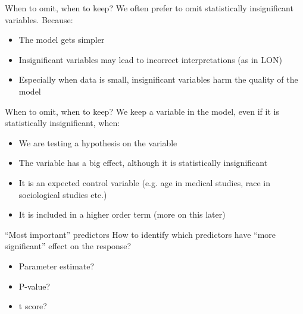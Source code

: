 \documentclass{beamer}\usepackage[]{graphicx}\usepackage[]{color}
\begin{document}
\begin{darkframes}
    
    \begin{frame}{When to omit, when to keep?}
      We often prefer to omit statistically insignificant variables. Because:
      \begin{itemize}
        \item The model gets simpler
        \item Insignificant variables may lead to incorrect interpretations (as in LON)
        \item Especially when data is small, insignificant variables harm the quality of the model
        
      \end{itemize}
      
    \end{frame}
    
    \begin{frame}{When to omit, when to keep?}
      We keep a variable in the model, even if it is statistically insignificant, when:
      \begin{itemize}
        \item We are testing a hypothesis on the variable
        \item The variable has a big effect, although it is statistically insignificant
        \item It is an expected control variable (e.g. age in medical studies, race in sociological studies etc.)
        \item It is included in a higher order term (more on this later)
        
      \end{itemize}
      
    \end{frame}
    
    
    \begin{frame}{``Most important'' predictors}
      How to identify which predictors have ``more significant'' effect on the response?
      
      \begin{itemize}
        \item[] Parameter estimate? \pause
        \item[] P-value? \pause
        \item[] t score? \pause \greencheckmark
        
      \end{itemize}
      
    \end{frame}
    

\end{darkframes}
\end{document}
